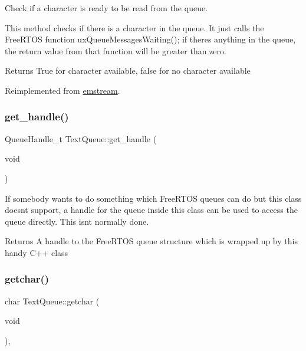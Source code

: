 Check if a character is ready to be read from the queue. 

This method checks if there is a character in the queue. It just calls the Free\+R\+T\+OS function {\ttfamily ux\+Queue\+Messages\+Waiting()}; if there\textquotesingle{}s anything in the queue, the return value from that function will be greater than zero. \begin{DoxyReturn}{Returns}
True for character available, false for no character available 
\end{DoxyReturn}


Reimplemented from \mbox{\hyperlink{classemstream_a64494c4283e4750d29d93df245045d56}{emstream}}.

\mbox{\label{class_text_queue_a0f83656a176a1a4d71ef825b8a423ab7}} 
\subsubsection{\texorpdfstring{get\+\_\+handle()}{get\_handle()}}
{\footnotesize\ttfamily Queue\+Handle\+\_\+t Text\+Queue\+::get\+\_\+handle (\begin{DoxyParamCaption}\item[{void}]{ }\end{DoxyParamCaption})\hspace{0.3cm}{\ttfamily [inline]}}

If somebody wants to do something which Free\+R\+T\+OS queues can do but this class doesn\textquotesingle{}t support, a handle for the queue inside this class can be used to access the queue directly. This isn\textquotesingle{}t normally done. \begin{DoxyReturn}{Returns}
A handle to the Free\+R\+T\+OS queue structure which is wrapped up by this handy C++ class 
\end{DoxyReturn}
\mbox{\label{class_text_queue_ab682ee4d2cbad87e9496ca424fa03b0a}} 
\subsubsection{\texorpdfstring{getchar()}{getchar()}}
{\footnotesize\ttfamily char Text\+Queue\+::getchar (\begin{DoxyParamCaption}\item[{void}]{ }\end{DoxyParamCaption})\hspace{0.3cm}{\ttfamily [inline]}, {\ttfamily [virtual]}}




